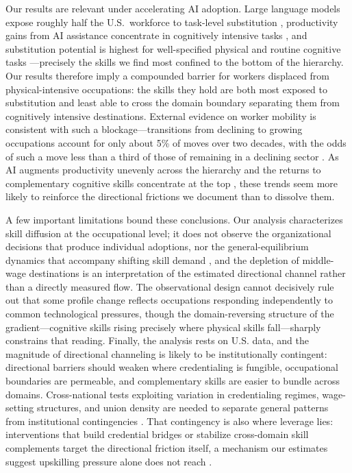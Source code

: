 \documentclass[11pt, letterpaper]{article} %
\newcommand{\parencite}[1]{\cite{#1}}
\begin{document}
Our results are relevant under accelerating AI adoption. Large language models expose roughly half the U.S.\ workforce to task-level substitution \parencite{eloundou_gpts_2024}, productivity gains from AI assistance concentrate in cognitively intensive tasks \parencite{noy_experimental_2023}, and substitution potential is highest for well-specified physical and routine cognitive tasks \parencite{acemoglu_robots_2020, zhang_future_2024}---precisely the skills we find most confined to the bottom of the hierarchy. Our results therefore imply a compounded barrier for workers displaced from physical-intensive occupations: the skills they hold are both most exposed to substitution and least able to cross the domain boundary separating them from cognitively intensive destinations. External evidence on worker mobility is consistent with such a blockage---transitions from declining to growing occupations account for only about 5\% of moves over two decades, with the odds of such a move less than a third of those of remaining in a declining sector \parencite{song_trapped_2026}. As AI augments productivity unevenly across the hierarchy and the returns to complementary cognitive skills concentrate at the top \parencite{acemoglu_kong_2026}, these trends seem more likely to reinforce the directional frictions we document than to dissolve them.

A few important limitations bound these conclusions. Our analysis characterizes skill diffusion at the occupational level; it does not observe the organizational decisions that produce individual adoptions, nor the general-equilibrium dynamics that accompany shifting skill demand \parencite{alabdulkareem_unpacking_2018}, and the depletion of middle-wage destinations is an interpretation of the estimated directional channel rather than a directly measured flow. The observational design cannot decisively rule out that some profile change reflects occupations responding independently to common technological pressures, though the domain-reversing structure of the gradient---cognitive skills rising precisely where physical skills fall---sharply constrains that reading. Finally, the analysis rests on U.S. data, and the magnitude of directional channeling is likely to be institutionally contingent: directional barriers should weaken where credentialing is fungible, occupational boundaries are permeable, and complementary skills are easier to bundle across domains. Cross-national tests exploiting variation in credentialing regimes, wage-setting structures, and union density are needed to separate general patterns from institutional contingencies \parencite{hosseinioun_skill_2025}. That contingency is also where leverage lies: interventions that build credential bridges or stabilize cross-domain skill complements target the directional friction itself, a mechanism our estimates suggest upskilling pressure alone does not reach \parencite{moro_universal_2021}.
\end{document}
